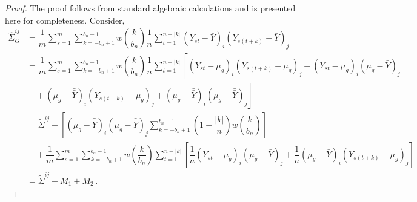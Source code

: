 \documentclass[11pt]{article}
\theoremstyle{remark}
\begin{document}
\begin{proof}
The proof follows from standard algebraic calculations and is presented here for completeness. Consider,
\begin{align*}
\hat{\Sigma}_{G}^{ij} &= \dfrac{1}{m}\sum_{s=1}^{m} \sum_{k=-b_n+1}^{b_n-1}w\left(\dfrac{k}{b_n}\right)\dfrac{1}{n}\sum_{t=1}^{n-|k|} \left(Y_{st}-\bar{\bar{Y}} \right)_i \left(Y_{s(t+k)}-\bar{\bar{Y}} \right)_j\\
&= \dfrac{1}{m}\sum_{s=1}^{m}\sum_{k=-b_n+1}^{b_n-1}w\left(\dfrac{k}{b_n}\right)\dfrac{1}{n}\sum_{t=1}^{n-|k|}  \left[ \left(Y_{st}-\mu_g \right)_i  \left(Y_{s(t+k)}-\mu_g \right)_j+  \left(Y_{st} - \mu_g \right)_i    \left(\mu_g - \bar{\bar{Y}} \right)_j \right. \\  
& \quad + \left. \left(\mu_g-\bar{\bar{Y}} \right)_i  \left(Y_{s(t+k)}-\mu_g \right)_j + \left(\mu_g-\bar{\bar{Y}} \right)_i  \left(\mu_g-\bar{\bar{Y}}  \right)_j  \right]\\
& = \tilde{\Sigma}^{ij} + \left[(\mu_g-\bar{\bar{Y}})_i(\mu_g-\bar{\bar{Y}})_j\sum_{k=-b_n+1}^{b_n-1}\left(1-\dfrac{|k|}{n}\right)w\left(\dfrac{k}{b_n}\right)\right] \\ 
& \quad  + \dfrac{1}{m}\sum_{s=1}^{m}\sum_{k=-b_n+1}^{b_n-1}  w\left(\dfrac{k}{b_n}\right)\sum_{t=1}^{n-|k|}  \left[\dfrac{1}{n} \left(Y_{st} - \mu_g \right)_i \left(\mu_g - \bar{\bar{Y}} \right)_j + \dfrac{1}{n} \left(\mu_g-\bar{\bar{Y}} \right)_i  \left(Y_{s(t+k)}-\mu_g \right)_j \right] \\ 
& = \tilde{\Sigma}^{ij} + M_1 + M_2\,.
\end{align*}


\end{proof}
\end{document}
